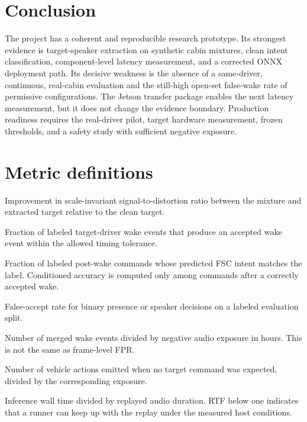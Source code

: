 \documentclass[11pt,a4paper]{article}
\begin{document}
\section{Conclusion}

The project has a coherent and reproducible research prototype. Its strongest
evidence is target-speaker extraction on synthetic cabin mixtures, clean
intent classification, component-level latency measurement, and a corrected
ONNX deployment path. Its decisive weakness is the absence of a same-driver,
continuous, real-cabin evaluation and the still-high open-set false-wake rate
of permissive configurations. The Jetson transfer package enables the next
latency measurement, but it does not change the evidence boundary. Production
readiness requires the real-driver pilot, target hardware measurement, frozen
thresholds, and a safety study with sufficient negative exposure.

\appendix
\section{Metric definitions}

\begin{description}[leftmargin=2.6cm,style=nextline]
  \item[SI-SDRi] Improvement in scale-invariant signal-to-distortion ratio
        between the mixture and extracted target relative to the clean target.
  \item[Wake recall] Fraction of labeled target-driver wake events that
        produce an accepted wake event within the allowed timing tolerance.
  \item[Intent accuracy] Fraction of labeled post-wake commands whose predicted
        FSC intent matches the label. Conditioned accuracy is computed only
        among commands after a correctly accepted wake.
  \item[FAR] False-accept rate for binary presence or speaker decisions on a
        labeled evaluation split.
  \item[False wakes/hour] Number of merged wake events divided by negative
        audio exposure in hours. This is not the same as frame-level FPR.
  \item[False actions/hour] Number of vehicle actions emitted when no target
        command was expected, divided by the corresponding exposure.
  \item[RTF] Inference wall time divided by replayed audio duration. RTF below
        one indicates that a runner can keep up with the replay under the
        measured host conditions.
\end{description}
\end{document}
